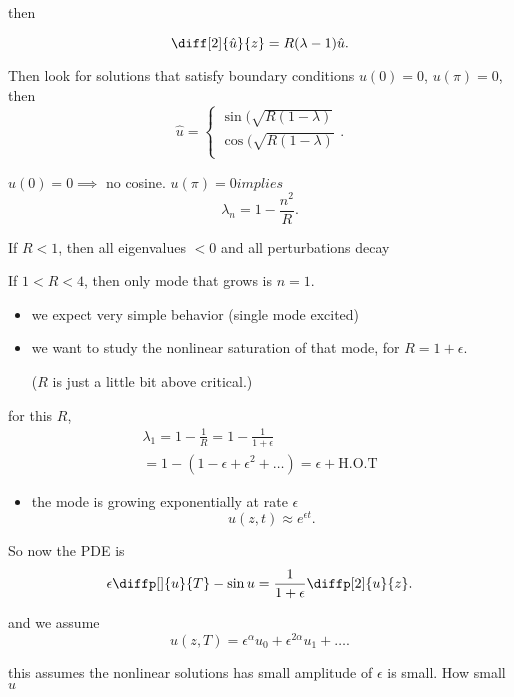then 

\[
\diff[2]{\hat u}{z} = R (\lambda -1) \hat u
.\] 

Then look for solutions that satisfy boundary conditions $u(0) = 0$, $u(\pi
) = 0$, then
\[
\hat u = \begin{cases}
  \sin( \sqrt{R (1 -\lambda)} \\
  \cos( \sqrt{R (1 -\lambda)} \\
\end{cases}
.\] 

$u (0) = 0 \implies $ no cosine. $u (\pi ) = 0 implies$
\[
\lambda _{n} = 1 - \frac{n^2}{R}
.\] 

If $R < 1$, then all eigenvalues $<0$ and all perturbations decay

If $1<R<4$, then only mode that grows is $n = 1$.
\begin{itemize}
  \item we expect very simple behavior (single mode excited)
  \item we want to study the nonlinear saturation of that mode, for $R
    = 1 + \epsilon $.

    ($R$ is just a little bit above critical.)
\end{itemize}

for this $R$, 
  \begin{align*}
    \lambda _{1} = 1 - \frac{1}{R} = 1 - \frac{1}{1+ \epsilon } \\
    = 1 - (1-\epsilon  + \epsilon ^2 + \dots) = \epsilon + \text{H.O.T}
  \end{align*}

  \begin{itemize}
    \item the mode is growing exponentially at rate $\epsilon $ 
      \[
        u(z,t) \approx e^{\epsilon t}
      .\] 
  \end{itemize}

  So now the PDE is 
  \[
  \epsilon \diffp[]{u}{T} - \sin u  = \frac{1}{1 + \epsilon } \diffp[2]{u}{z}
  .\] 

  and we assume
  \[
    u(z,T) = \epsilon ^{\alpha } u_0 + \epsilon ^{2 \alpha } u_{1} + \dots
  .\] 

  this assumes the nonlinear solutions has small amplitude of $ \epsilon $ is
  small. How small $u$
